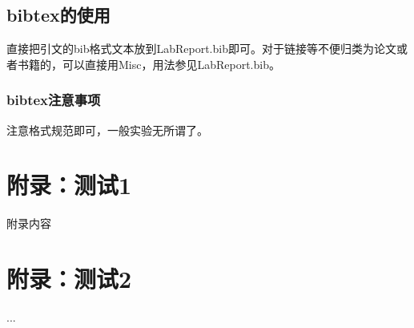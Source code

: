 \documentclass[UTF8,a4paper,12pt]{ctexart}
\begin{document}
\subsection{bibtex的使用}
直接把引文的bib格式文本放到LabReport.bib即可。对于链接等不便归类为论文或者书籍的，可以直接用Misc，用法参见LabReport.bib。

\subsubsection{bibtex注意事项}
注意格式规范即可，一般实验无所谓了。









\begin{appendices}
\section{附录：测试1}
附录内容
\section{附录：测试2}
...
\end{appendices}
\end{document}
